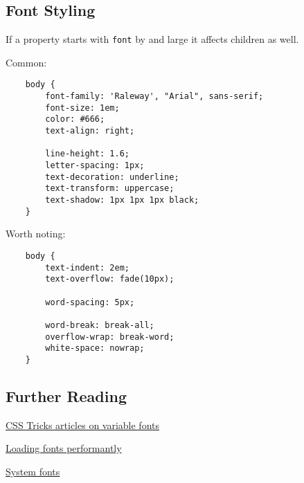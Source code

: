 \subsection{Font Styling}

If a property starts with \texttt{font} by and large it affects children as well.

Common:

\begin{verbatim}
    body {
        font-family: 'Raleway', "Arial", sans-serif;
        font-size: 1em;
        color: #666;
        text-align: right;

        line-height: 1.6;
        letter-spacing: 1px;
        text-decoration: underline;
        text-transform: uppercase;
        text-shadow: 1px 1px 1px black;
    }
\end{verbatim}

Worth noting:

\begin{verbatim}
    body {
        text-indent: 2em;
        text-overflow: fade(10px);

        word-spacing: 5px;

        word-break: break-all;
        overflow-wrap: break-word;
        white-space: nowrap;
    }
\end{verbatim}

\subsection{Further Reading}

\href{https://css-tricks.com/guides/opentype-variable-fonts/}{CSS Tricks articles on variable fonts}

\href{https://css-tricks.com/fout-foit-foft/}{Loading fonts performantly}

\href{https://css-tricks.com/snippets/css/system-font-stack/}{System fonts}
